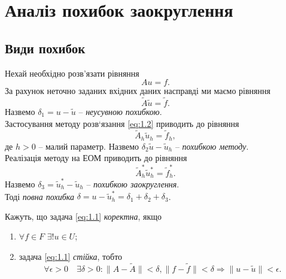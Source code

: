 \section{Аналіз похибок заокруглення}

\subsection{Види похибок}

Нехай необхідно розв’язати рівняння
\begin{equation}
	\label{eq:1.1}
	Au = f.
\end{equation}
За рахунок неточно заданих вхідних даних насправді ми маємо рівняння
\begin{equation}
	\label{eq:1.2}
	\tilde A \tilde u = \tilde f.
\end{equation}
Назвемо $\delta_1 = u - \tilde u$ -- \textit{неусувною похибкою}. \\

Застосування методу розв‘язання \eqref{eq:1.2} приводить до рівняння
\begin{equation}
	\label{eq:1.3}
	\tilde A_h \tilde u_h = \tilde f_h,
\end{equation}
де $h > 0$ -- малий параметр. Назвемо $\delta_2 \tilde u - \tilde u_h$ -- \textit{похибкою методу}. \\

Реалізація методу на ЕОМ приводить до рівняння
\begin{equation}
	\label{eq:1.4}
	\tilde A_h^* \tilde u_h^* = \tilde f_h^*.
\end{equation}
Назвемо $\delta_3 = \tilde u_h^* - \tilde u_h$ -- \textit{похибкою заокруглення}. \\

Тоді \textit{повна похибка} $\delta = u - \tilde u_h^* = \delta_1 + \delta_2 + \delta_3$. \\

\begin{definition}
	Кажуть, що задача \eqref{eq:1.1} \textit{коректна}, якщо
	\begin{enumerate}
		\item $\forall f \in F$ $\exists! u \in U$;
		\item задача \eqref{eq:1.1} \textit{стійка}, тобто
		\begin{equation}
			\label{eq:1.5}
			\forall \epsilon > 0 \quad \exists \delta > 0: \|A-\tilde A\| < \delta, \|f-\tilde f\| < \delta \Rightarrow \|u - \tilde u\| < \epsilon.
		\end{equation}
	\end{enumerate}
\end{definition}

